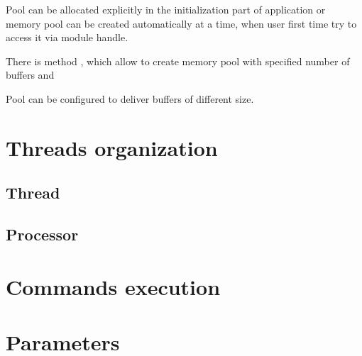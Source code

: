 Pool can be allocated explicitly in the initialization part of application
or memory pool can be created automatically at a time, when user first time 
try to access it via module handle. 

There is method , which allow to 
create memory pool with specified number of buffers and  
 
   

Pool can be configured to deliver buffers of different size. 





\section{Threads organization}

\subsection{Thread}

\subsection{Processor}



\section{Commands execution}


\section{Parameters}
